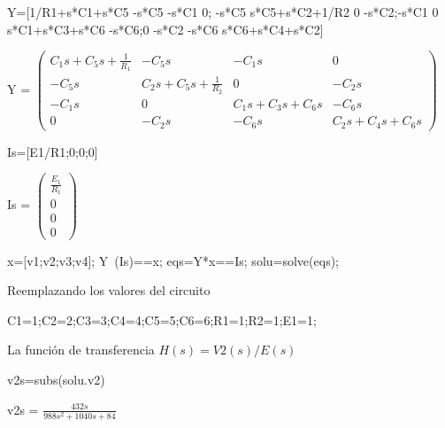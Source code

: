 \documentclass[10pt,a4paper]{article} %
\begin{document}
	\begin{matlabcode}
		Y=[1/R1+s*C1+s*C5 -s*C5 -s*C1 0; -s*C5 s*C5+s*C2+1/R2 0 -s*C2;-s*C1 0 s*C1+s*C3+s*C6 -s*C6;0 -s*C2 -s*C6 s*C6+s*C4+s*C2]
	\end{matlabcode}
	\begin{matlabsymbolicoutput}
		Y = 
		$\displaystyle \left(\begin{array}{cccc}
		C_1  s+C_5  s+\frac{1}{R_1 } & -C_5  s & -C_1  s & 0\\
		-C_5  s & C_2  s+C_5  s+\frac{1}{R_2 } & 0 & -C_2  s\\
		-C_1  s & 0 & C_1  s+C_3  s+C_6  s & -C_6  s\\
		0 & -C_2  s & -C_6  s & C_2  s+C_4  s+C_6  s
		\end{array}\right)$
	\end{matlabsymbolicoutput}
	\begin{matlabcode}
		Is=[E1/R1;0;0;0]
	\end{matlabcode}
	\begin{matlabsymbolicoutput}
		Is = 
		$\displaystyle \left(\begin{array}{c}
		\frac{E_1 }{R_1 }\\
		0\\
		0\\
		0
		\end{array}\right)$
	\end{matlabsymbolicoutput}
	\begin{matlabcode}
		x=[v1;v2;v3;v4];
		Y\ (Is)==x;
		eqs=Y*x==Is;
		solu=solve(eqs);
		\end{matlabcode}
		
		
		\begin{par}
		\begin{flushleft}
		Reemplazando los valores del circuito
		\end{flushleft}
		\end{par}
		
		\begin{matlabcode}
		C1=1;C2=2;C3=3;C4=4;C5=5;C6=6;R1=1;R2=1;E1=1;
		\end{matlabcode}
		
		\begin{par}
		\begin{flushleft}
		La función de transferencia $ H(s)=V2(s)/E(s)$
		\end{flushleft}
		\end{par}
		
		\begin{matlabcode}
		v2s=subs(solu.v2)
		\end{matlabcode}
		\begin{matlabsymbolicoutput}
		v2s = 
		$\displaystyle \frac{432 s}{988 s^2 +1040 s+84}$
		\end{matlabsymbolicoutput}
		
\end{document}
